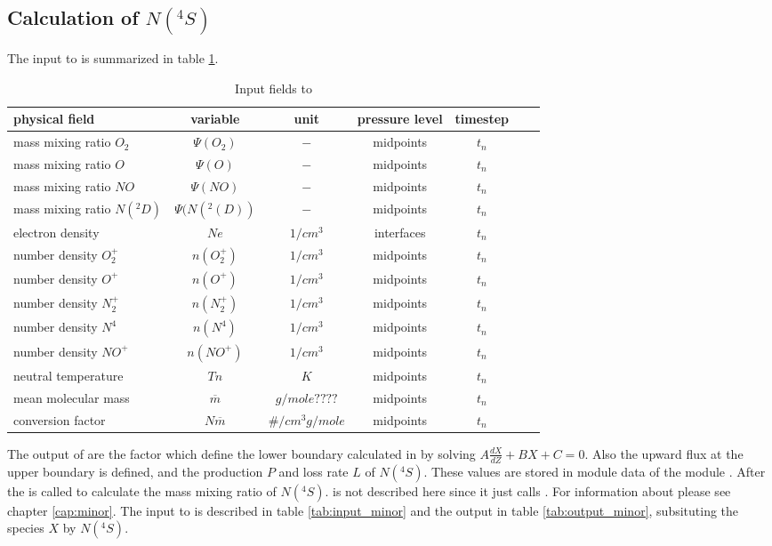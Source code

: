 \subsection{Calculation of $N(^4S)$}\label{subcap:comp_n4s}
%
The input to  is summarized in table
\ref{tab:input_comp_n4s}.
%
\begin{table}[tb]
\begin{tabular}{|p{3.5cm} ||c|c|c|c|c|c|} \hline
physical field               & variable        & unit&pressure
level& timestep
\\ \hline \hline
%
mass mixing ratio $O_2$ &       $\Psi(O_2)$              & $-$   &  midpoints & $t_n$\\
mass mixing ratio $O$ &         $\Psi(O  )$              & $-$   &  midpoints & $t_n$\\
mass mixing ratio $NO$ &       $\Psi(NO)$              & $-$   &  midpoints & $t_n$\\
mass mixing ratio $N(^2D)$ &       $\Psi(N(^2(D))$              & $-$   &  midpoints & $t_n$\\
electron density&       $Ne$              & $1/cm^3$   &  interfaces & $t_n$\\
number density $O_2^+$&       $n(O_2^+)$              & $1/cm^3$   &  midpoints & $t_n$\\
number density $O^+$&       $n(O^+)$              & $1/cm^3$   &  midpoints & $t_n$\\
number density $N_2^+$&       $n(N_2^+)$              & $1/cm^3$   &  midpoints & $t_n$\\
number density $N^4$&       $n(N^4)$              & $1/cm^3$   &  midpoints & $t_n$\\
number density $NO^+$&       $n(NO^+)$              & $1/cm^3$   &  midpoints & $t_n$\\
neutral temperature&       $Tn$              & $K$   &  midpoints & $t_n$\\
mean molecular mass&       $\overline{m}$              & $g/mole????$   &  midpoints & $t_n$\\
conversion factor&       $N \overline{m}$              & $\#/cm^3
g/mole$   &  midpoints & $t_n$
 \\ \hline
\end{tabular}
\caption{Input fields to }
\label{tab:input_comp_n4s}
\end{table}
%
The output of  are the factor which define
the lower boundary calculated in  by solving
$A\frac{d X}{dZ} + B X + C = 0$. Also the upward flux at the upper
boundary is defined, and the production $P$ and loss rate $L$ of
$N(^4S)$. These values are stored in module data of the module
. After  the
 is called to calculate the mass mixing
ratio of $N(^4S)$.  is not described here
since it just calls . For information about
 please see chapter \ref{cap:minor}. The input
to  is described in table
\ref{tab:input_minor} and the output in table
\ref{tab:output_minor}, subsituting the species $X$ by $N(^4S)$. \\

